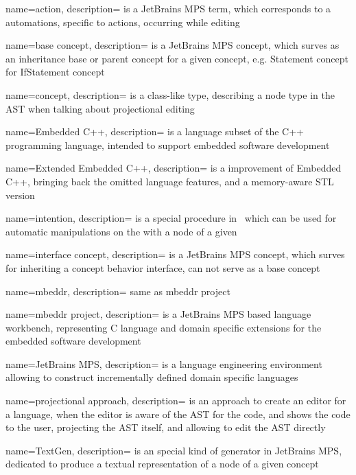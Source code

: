 {
  name=action,
  description={ is a JetBrains MPS term, which corresponds to a automations, specific to actions, occurring while editing}
}




{
  name=base concept,
  description={ is a JetBrains MPS concept, which surves as an inheritance base or parent concept for a given concept, e.g. Statement concept for IfStatement concept}
}


{
  name=concept,
  description={ is a class-like type, describing a node type in the AST when talking about projectional editing}
}




{
  name=Embedded C++,
  description={ is a language subset of the C++ programming language, intended to
  support embedded software development}
}

{
  name=Extended Embedded C++,
  description={ is a improvement of Embedded C++, bringing back the omitted language features, and a memory-aware STL version}
}


{
  name=intention,
  description={ is a special procedure in \jbmps\ which can be used for automatic manipulations on the  with a node of a given }
}

{
  name=interface concept,
  description={ is a JetBrains MPS concept, which surves for inheriting a concept behavior interface, can not serve as a base concept}
}


{
  name=mbeddr,
  description={ same as mbeddr project}
}


{
  name=mbeddr project,
  description={ is a JetBrains MPS based language workbench, representing C language and domain specific
  extensions for the embedded software development}
}


{
  name=JetBrains MPS,
  description={ is a language engineering environment 
  allowing to construct incrementally defined domain specific languages}
}

{
  name=projectional approach,
  description={ is an approach to create an editor for a language, when the editor is 
  aware of the AST for the code, and shows the code to the user, projecting the 
  AST itself, and allowing to edit the AST directly}
}


{
  name=TextGen,
  description={ is an special kind of generator in JetBrains MPS, dedicated to produce a textual representation of a node of a given concept}
}
